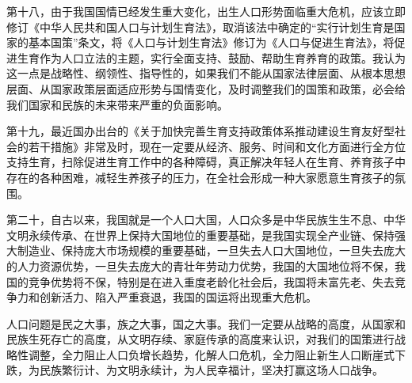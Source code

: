 \documentclass[UTF8,11pt,oneside]{ctexart}
\begin{document}
第十八，由于我国国情已经发生重大变化，出生人口形势面临重大危机，应该立即修订《中华人民共和国人口与计划生育法》，取消该法中确定的“实行计划生育是国家的基本国策”条文，将《人口与计划生育法》修订为《人口与促进生育法》，将促进生育作为人口立法的主题，实行全面支持、鼓励、帮助生育养育的政策。我认为这一点是战略性、纲领性、指导性的，如果我们不能从国家法律层面、从根本思想层面、从国家政策层面适应形势与国情变化，及时调整我们的国策和政策，必会给我们国家和民族的未来带来严重的负面影响。

第十九，最近国办出台的《关于加快完善生育支持政策体系推动建设生育友好型社会的若干措施》非常及时，现在一定要从经济、服务、时间和文化方面进行全方位支持生育，扫除促进生育工作中的各种障碍，真正解决年轻人在生育、养育孩子中存在的各种困难，减轻生养孩子的压力，在全社会形成一种大家愿意生育孩子的氛围。

第二十，自古以来，我国就是一个人口大国，人口众多是中华民族生生不息、中华文明永续传承、在世界上保持大国地位的重要基础，是我国实现全产业链、保持强大制造业、保持庞大市场规模的重要基础，一旦失去人口大国地位，一旦失去庞大的人力资源优势，一旦失去庞大的青壮年劳动力优势，我国的大国地位将不保，我国的竞争优势将不保，特别是在进入重度老龄化社会后，我国将未富先老、失去竞争力和创新活力、陷入严重衰退，我国的国运将出现重大危机。

人口问题是民之大事，族之大事，国之大事。我们一定要从战略的高度，从国家和民族生死存亡的高度，从文明存续、家庭传承的高度来认识，对我们的国策进行战略性调整，全力阻止人口负增长趋势，化解人口危机，全力阻止新生人口断崖式下跌，为民族繁衍计、为文明永续计，为人民幸福计，坚决打赢这场人口战争。
\end{document}
